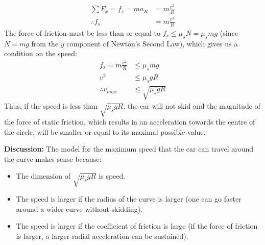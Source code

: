 \begin{example}
\begin{align*}
\sum F_x = f_s =ma_R&=m\frac{v^2}{R}\\
\therefore f_s &= m\frac{v^2}{R}
\end{align*}
The force of friction must be less than or equal to $f_s\leq\mu_sN=\mu_smg$ (since $N=mg$ from the $y$ component of Newton's Second Law), which gives us a condition on the speed:
\begin{align*}
f_s = m\frac{v^2}{R}&\leq\mu_smg\\
v^2 &\leq \mu_s g R\\
\therefore v_{max} &\leq \sqrt{\mu_s g R}
\end{align*}
Thus, if the speed is less than $\sqrt{\mu_s g R}$, the car will not skid and the magnitude of the force of static friction, which results in an acceleration towards the centre of the circle, will be smaller or equal to its maximal possible value.

\textbf{Discussion:} The model for the maximum speed that the car can travel around the curve makes sense because:
\begin{itemize}
\item The dimension of $\sqrt{\mu_s g R}$ is speed.
\item The speed is larger if the radius of the curve is larger (one can go faster around a wider curve without skidding).
\item The speed is larger if the coefficient of friction is large (if the force of friction is larger, a larger radial acceleration can be sustained).
\end{itemize}
\end{example}

